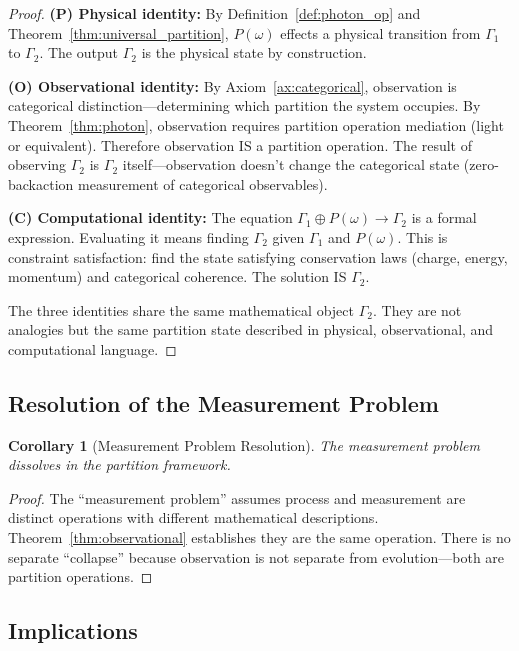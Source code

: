 \documentclass[aps,prd,twocolumn,superscriptaddress,floatfix,nofootinbib]{revtex4-2}
\newtheorem{corollary}[theorem]{Corollary}
\theoremstyle{remark}
\newcommand{\Pop}{P}
\newcommand{\Gstate}{\Gamma}
\begin{document}
\begin{proof}
\textbf{(P) Physical identity:} By Definition~\ref{def:photon_op} and Theorem~\ref{thm:universal_partition}, $\Pop(\omega)$ effects a physical transition from $\Gstate_1$ to $\Gstate_2$. The output $\Gstate_2$ is the physical state by construction.

\textbf{(O) Observational identity:} By Axiom~\ref{ax:categorical}, observation is categorical distinction---determining which partition the system occupies. By Theorem~\ref{thm:photon}, observation requires partition operation mediation (light or equivalent). Therefore observation IS a partition operation. The result of observing $\Gstate_2$ is $\Gstate_2$ itself---observation doesn't change the categorical state (zero-backaction measurement of categorical observables).

\textbf{(C) Computational identity:} The equation $\Gstate_1 \oplus \Pop(\omega) \to \Gstate_2$ is a formal expression. Evaluating it means finding $\Gstate_2$ given $\Gstate_1$ and $\Pop(\omega)$. This is constraint satisfaction: find the state satisfying conservation laws (charge, energy, momentum) and categorical coherence. The solution IS $\Gstate_2$.

The three identities share the same mathematical object $\Gstate_2$. They are not analogies but the same partition state described in physical, observational, and computational language.
\end{proof}

\subsection{Resolution of the Measurement Problem}

\begin{corollary}[Measurement Problem Resolution]
\label{cor:measurement}
The measurement problem dissolves in the partition framework.
\end{corollary}

\begin{proof}
The ``measurement problem'' assumes process and measurement are distinct operations with different mathematical descriptions. Theorem~\ref{thm:observational} establishes they are the same operation. There is no separate ``collapse'' because observation is not separate from evolution---both are partition operations.
\end{proof}

\subsection{Implications}
\end{document}

